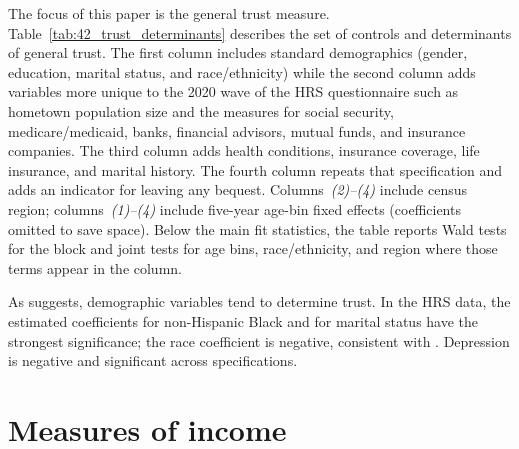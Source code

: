 \par The focus of this paper is the general trust measure. Table~\ref{tab:42_trust_determinants} describes the set of controls and determinants of general trust. The first column includes standard demographics (gender, education, marital status, and race/ethnicity) while the second column adds variables more unique to the 2020 wave of the HRS questionnaire such as hometown population size and the  measures for social security, medicare/medicaid, banks, financial advisors, mutual funds, and insurance companies. The third column adds health conditions, insurance coverage, life insurance, and marital history. The fourth column repeats that specification and adds an indicator for leaving any bequest. Columns~\textit{(2)--(4)} include census region; columns~\textit{(1)--(4)} include five-year age-bin fixed effects (coefficients omitted to save space). Below the main fit statistics, the table reports Wald tests for the  block and joint tests for age bins, race/ethnicity, and region where those terms appear in the column.

\FloatBarrier

\par As \cite{Alesina2000} suggests, demographic variables tend to determine trust. In the HRS data, the estimated coefficients for non-Hispanic Black and for marital status have the strongest significance; the race coefficient is negative, consistent with \cite{Alsan2018}. Depression is negative and significant across specifications.

\section{Measures of income}

